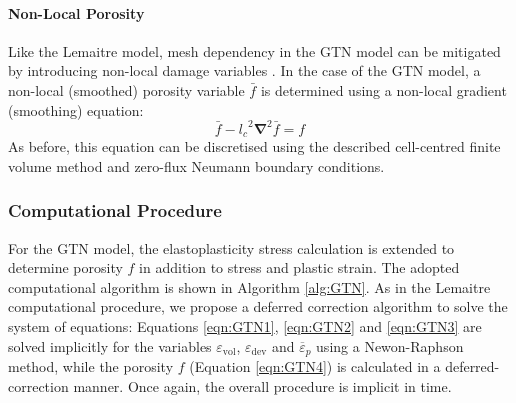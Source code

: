 \documentclass[sn-mathphys,Numbered]{sn-jnl}%
\newcommand{\bb}{\boldsymbol}
\begin{document}
\paragraph{Non-Local Porosity}

Like the Lemaitre model, mesh dependency in the GTN model can be mitigated by introducing non-local damage variables \cite{reusch_non-local_2003, leclerc_micromechanics-based_2020}.
In the case of the GTN model, a non-local (smoothed) porosity variable $\bar{f}$ is determined using a non-local gradient (smoothing) equation:
\begin{equation}
	\bar{f} - {l_c}^2 \bb{\nabla}^2 \bar{f} = f
\end{equation}
As before, this equation can be discretised using the described cell-centred finite volume method and zero-flux Neumann boundary conditions.



\subsubsection{Computational Procedure}

For the GTN model, the elastoplasticity stress calculation is extended to determine porosity $f$ in addition to stress and plastic strain.
The adopted computational algorithm is shown in Algorithm \ref{alg:GTN}.
As in the Lemaitre computational procedure, we propose a deferred correction algorithm to solve the system of equations:
Equations \ref{eqn:GTN1}, \ref{eqn:GTN2} and \ref{eqn:GTN3} are solved implicitly for the variables ${\varepsilon}_\text{vol}$, ${\varepsilon}_\text{dev}$ and $\overline{{\varepsilon}}_p$ using a Newon-Raphson method, while the porosity $f$ (Equation \ref{eqn:GTN4}) is calculated in a deferred-correction manner.
Once again, the overall procedure is implicit in time.
\end{document}
